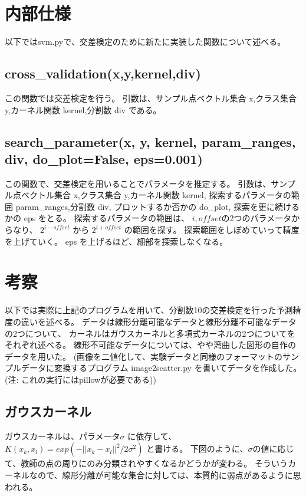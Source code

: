 \documentclass[]{jsarticle}
\begin{document}
\section{内部仕様}
以下ではsvm.pyで、交差検定のために新たに実装した関数について述べる。

\subsection{cross\_validation(x,y,kernel,div)}
この関数では交差検定を行う。
引数は、サンプル点ベクトル集合 x,クラス集合 y,カーネル関数 kernel,分割数 div である。


\subsection{search\_parameter(x, y, kernel, param\_ranges, div, do\_plot=False, eps=0.001)}
この関数で、交差検定を用いることでパラメータを推定する。
引数は、サンプル点ベクトル集合 x,クラス集合 y,カーネル関数 kernel,
探索するパラメータの範囲 param\_ranges,分割数 div,
プロットするか否かの do\_plot,
探索を更に続けるかの eps をとる。
探索するパラメータの範囲は、 $i,offset$の2つのパラメータからなり、
$2^{i - offset} $ から $2^{ i + offset }$ の範囲を探す。
探索範囲をしぼめていって精度を上げていく。
eps を上げるほど、細部を探索しなくなる。


\section{考察}
以下では実際に上記のプログラムを用いて、分割数10の交差検定を行った予測精度の違いを述べる。
データは線形分離可能なデータと線形分離不可能なデータの2つについて、
カーネルはガウスカーネルと多項式カーネルの2つについてをそれぞれ述べる。
線形不可能なデータについては、やや湾曲した図形の自作のデータを用いた。
(画像を二値化して、実験データと同様のフォーマットのサンプルデータに変換するプログラム
image2scatter.py を書いてデータを作成した。(注: これの実行にはpillowが必要である))

\newpage
\subsection{ガウスカーネル}
ガウスカーネルは、パラメータ$\sigma$ に依存して、
$K(x_k,x_l) = exp(-||x_k-x_l||^2 / 2\sigma^2) $ と書ける。
下図のように、$\sigma$の値に応じて、教師の点の周りにのみ分類されやすくなるかどうかが変わる。
そういうカーネルなので、線形分離が可能な集合に対しては、本質的に弱点があるように思われる。
\end{document}
